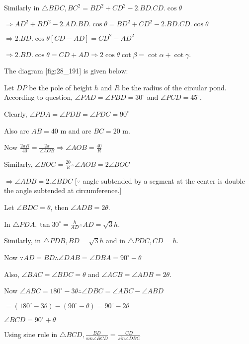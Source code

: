  Similarly in $\triangle BDC, BC^2 = BD^2 + CD^2 - 2.BD.CD.\cos\theta$

  $\Rightarrow AD^2 + BD^2 - 2.AD.BD.\cos\theta = BD^2 + CD^2 - 2.BD.CD.\cos\theta$

  $\Rightarrow 2.BD.\cos\theta[CD - AD] = CD^2 - AD^2$

  $\Rightarrow 2.BD.\cos\theta = CD + AD \Rightarrow 2\cos\theta\cot\beta = \cot\alpha +
  \cot\gamma$.

\item The diagram [fig:28_191] is given below:

  \startplacefigure[reference=fig:28_191]
    \externalfigure[28_191.pdf]
  \stopplacefigure

  Let $DP$ be the pole of height $h$ and $R$ be the radius of the circular pond.
  According to question, $\angle PAD = \angle PBD = 30^\circ$ and $\angle PCD = 45^\circ$.

  Clearly, $\angle PDA = \angle PDB = \angle PDC = 90^\circ$

  Also arc $AB = 40$ m and arc $BC = 20$ m.

  Now $\frac{2\pi R}{40} = \frac{2\pi}{\angle AOB}\Rightarrow \angle AOB = \frac{40}{R}$

  Similarly, $\angle BOC = \frac{20}{R} \therefore \angle AOB = 2\angle BOC$

  $\Rightarrow \angle ADB = 2.\angle BDC$ [$\because$ angle subtended by a segment at the
    center is double the angle subtended at circumference.]

  Let $\angle BDC = \theta$, then $\angle ADB = 2\theta$.

  In $\triangle PDA, \tan30^\circ = \frac{h}{AD} \therefore AD = \sqrt{3}h$.

  Similarly, in $\triangle PDB, BD = \sqrt{3}h$ and in $\triangle PDC, CD = h$.

  Now $\because AD = BD \therefore \angle DAB = \angle DBA = 90^\circ - \theta$

  Also, $\angle BAC = \angle BDC = \theta$ and $\angle ACB = \angle ADB = 2\theta$.

  Now $\angle ABC = 180^\circ - 3\theta \therefore \angle DBC = \angle ABC - \angle ABD$

  $= (180^\circ - 3\theta) - (90^\circ - \theta) = 90^\circ - 2\theta$

  $\angle BCD = 90^\circ + \theta$

  Using sine rule in $\triangle BCD, \frac{BD}{sin\angle BCD} = \frac{CD}{sin\angle DBC}$

